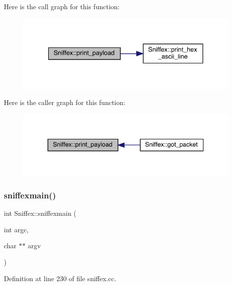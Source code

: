 Here is the call graph for this function\+:\nopagebreak
\begin{figure}[H]
\begin{center}
\leavevmode
\includegraphics[width=323pt]{class_sniffex_a1b24163d441d38f3672800c3de85d149_cgraph}
\end{center}
\end{figure}
Here is the caller graph for this function\+:\nopagebreak
\begin{figure}[H]
\begin{center}
\leavevmode
\includegraphics[width=331pt]{class_sniffex_a1b24163d441d38f3672800c3de85d149_icgraph}
\end{center}
\end{figure}
\mbox{\label{class_sniffex_a41e146d588c285c94c0beee223d8552b}} 
\subsubsection{\texorpdfstring{sniffexmain()}{sniffexmain()}}
{\footnotesize\ttfamily int Sniffex\+::sniffexmain (\begin{DoxyParamCaption}\item[{int}]{argc,  }\item[{char $\ast$$\ast$}]{argv }\end{DoxyParamCaption})}



Definition at line 230 of file sniffex.\+cc.

